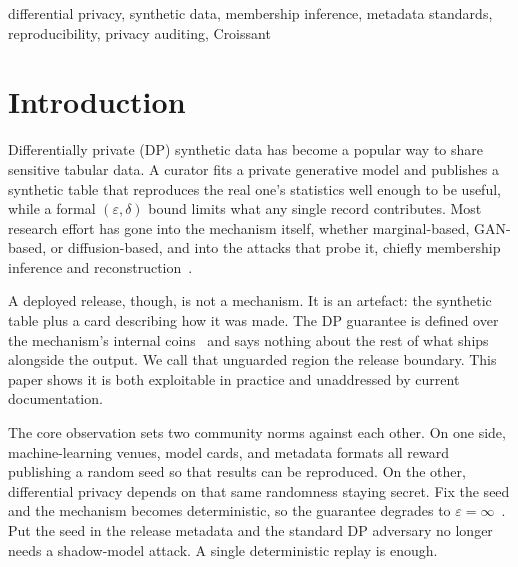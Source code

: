 \documentclass[conference]{IEEEtran}
\newcommand{\eps}{\varepsilon}
\begin{document}
\begin{IEEEkeywords}
differential privacy, synthetic data, membership inference, metadata standards, reproducibility,
privacy auditing, Croissant
\end{IEEEkeywords}

\section{Introduction}
Differentially private (DP) synthetic data has become a popular way to share sensitive tabular data.
A curator fits a private generative model and publishes a synthetic table that reproduces the real
one's statistics well enough to be useful, while a formal $(\eps,\delta)$ bound limits what any single
record contributes. Most research effort has gone into the mechanism itself, whether marginal-based,
GAN-based, or diffusion-based, and into the attacks that probe it, chiefly membership inference and
reconstruction~\cite{stadler2022,annamalai2024}.

A deployed release, though, is not a mechanism. It is an artefact: the synthetic table plus a card
describing how it was made. The DP guarantee is defined over the mechanism's internal
coins~\cite{dwork2014,dwork2006} and says nothing about the rest of what ships alongside the output.
We call that unguarded region the release boundary. This paper shows it is both exploitable in
practice and unaddressed by current documentation.

The core observation sets two community norms against each other. On one side, machine-learning
venues, model cards, and metadata formats all reward publishing a random seed so that results can be
reproduced. On the other, differential privacy depends on that same randomness staying secret. Fix the
seed and the mechanism becomes deterministic, so the guarantee degrades to
$\eps{=}\infty$~\cite{dwork2014,dodis2012,garfinkel2020}. Put the seed in the release metadata and the
standard DP adversary no longer needs a shadow-model attack. A single deterministic replay is enough.
\end{document}
